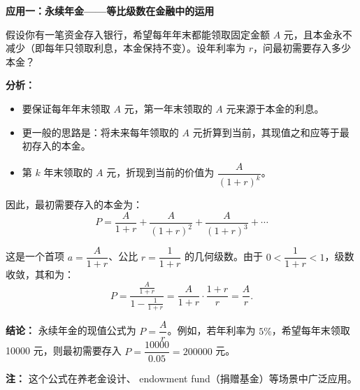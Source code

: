 \documentclass[fontset=fandol]{ctexart}
\newenvironment{custom}[1]{\par\noindent\textbf{#1}\quad}{\par\vspace{0.8em}}
\begin{document}
\begin{custom}{应用一：永续年金——等比级数在金融中的运用}

假设你有一笔资金存入银行，希望每年年末都能领取固定金额 \(A\) 元，且本金永不减少（即每年只领取利息，本金保持不变）。设年利率为 \(r\)，问最初需要存入多少本金？

\textbf{分析：}
\begin{itemize}
\item 要保证每年年末领取 \(A\) 元，第一年末领取的 \(A\) 元来源于本金的利息。
\item 更一般的思路是：将未来每年领取的 \(A\) 元折算到当前，其现值之和应等于最初存入的本金。
\item 第 \(k\) 年末领取的 \(A\) 元，折现到当前的价值为 \(\dfrac{A}{(1+r)^k}\)。
\end{itemize}

因此，最初需要存入的本金为：
\[
P = \frac{A}{1+r} + \frac{A}{(1+r)^2} + \frac{A}{(1+r)^3} + \cdots
\]

这是一个首项 \(a = \dfrac{A}{1+r}\)、公比 \(r = \dfrac{1}{1+r}\) 的几何级数。由于 \(0 < \dfrac{1}{1+r} < 1\)，级数收敛，其和为：
\[
P = \frac{\frac{A}{1+r}}{1 - \frac{1}{1+r}} = \frac{A}{1+r} \cdot \frac{1+r}{r} = \frac{A}{r}.
\]

\textbf{结论：} 永续年金的现值公式为 \(P = \dfrac{A}{r}\)。例如，若年利率为 \(5\%\)，希望每年末领取 10000 元，则最初需要存入 \(P = \dfrac{10000}{0.05} = 200000\) 元。

\textbf{注：} 这个公式在养老金设计、 endowment fund（捐赠基金）等场景中广泛应用。
\end{custom}
\end{document}

